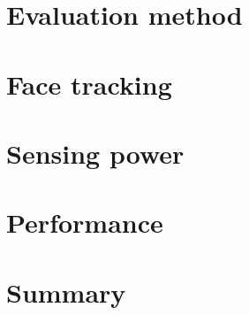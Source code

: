 \section{Evaluation method}
\section{Face tracking}
\label{section:face_tracking}
\section{Sensing power}
\section{Performance}
\section{Summary}